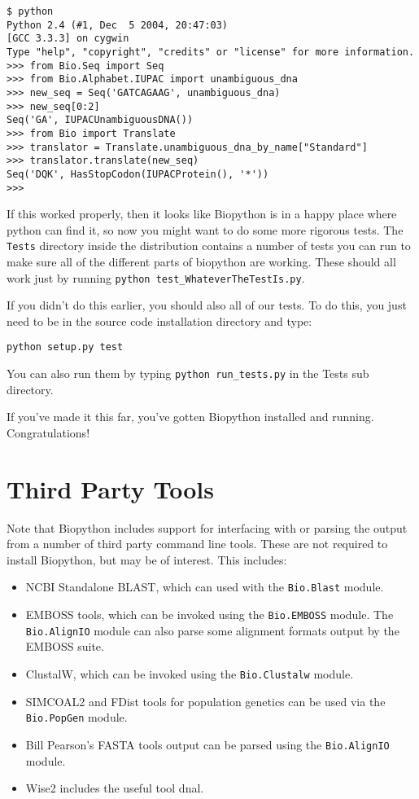 \documentclass{article}
\begin{document}
\begin{verbatim}
$ python
Python 2.4 (#1, Dec  5 2004, 20:47:03)
[GCC 3.3.3] on cygwin
Type "help", "copyright", "credits" or "license" for more information.
>>> from Bio.Seq import Seq
>>> from Bio.Alphabet.IUPAC import unambiguous_dna
>>> new_seq = Seq('GATCAGAAG', unambiguous_dna)
>>> new_seq[0:2]
Seq('GA', IUPACUnambiguousDNA())
>>> from Bio import Translate
>>> translator = Translate.unambiguous_dna_by_name["Standard"]
>>> translator.translate(new_seq)
Seq('DQK', HasStopCodon(IUPACProtein(), '*'))
>>>
\end{verbatim}

If this worked properly, then it looks like Biopython is in a happy place where python can find it, so now you might want to do some more rigorous tests. The \verb|Tests| directory inside the distribution contains a number of tests you can run to make sure all of the different parts of biopython are working. These should all work just by running \verb|python test_WhateverTheTestIs.py|. 

If you didn't do this earlier, you should also all of our tests. To do this, you just need to be in the source code installation directory and type:

\begin{verbatim}
python setup.py test
\end{verbatim}

You can also run them by typing \verb|python run_tests.py| in the Tests sub directory.

If you've made it this far, you've gotten Biopython installed and running.
Congratulations!

\section{Third Party Tools}

Note that Biopython includes support for interfacing with or parsing the output from a number of third party command line tools.  These are not required to install Biopython, but may be of interest.  This includes:

\begin{itemize}
\item NCBI Standalone BLAST, which can used with the \verb|Bio.Blast| module.
\item EMBOSS tools, which can be invoked using the \verb|Bio.EMBOSS| module.  The \verb|Bio.AlignIO| module can also parse some alignment formats output by the EMBOSS suite.
\item ClustalW, which can be invoked using the \verb|Bio.Clustalw| module.
\item SIMCOAL2 and FDist tools for population genetics can be used via the \verb|Bio.PopGen| module.
\item Bill Pearson's FASTA tools output can be parsed using the \verb|Bio.AlignIO| module.
\item Wise2 includes the useful tool dnal.
\end{itemize}
\end{document}
